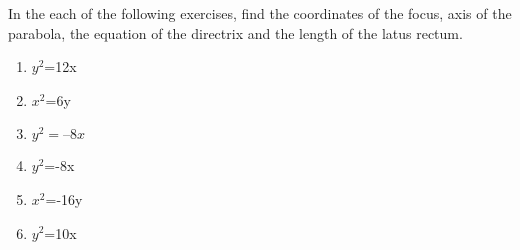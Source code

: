 In the each of the following exercises, find the coordinates of the focus, axis of the parabola, the equation of the directrix and the length of the latus rectum.
\begin{enumerate}[label=\thesubsection.\arabic*,ref=\thesubsection.\theenumi]
\item $y^2$=12x 
\label{chapters/11/11/2/1}
\\
\solution
\item $x^2$=6y 
\\
\solution
\item 
$y^2 = –8x$
\\
\solution
\item $y^2$=-8x

\item $x^2$=-16y
\\
\solution

\item $y^2$=10x  


\end{enumerate}
